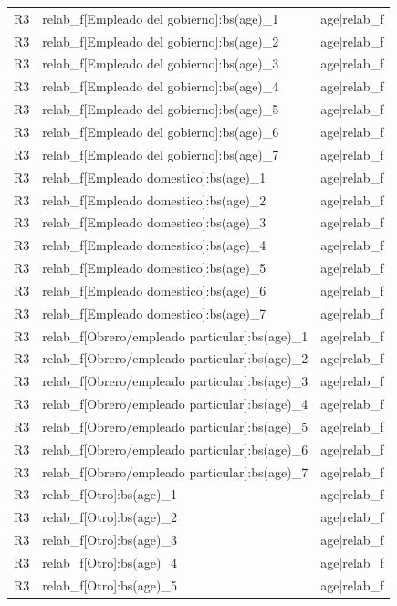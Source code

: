 \begin{longtable}{lll}
R3 & relab\_f[Empleado del gobierno]:bs(age)\_1 & age|relab\_f \\
R3 & relab\_f[Empleado del gobierno]:bs(age)\_2 & age|relab\_f \\
R3 & relab\_f[Empleado del gobierno]:bs(age)\_3 & age|relab\_f \\
R3 & relab\_f[Empleado del gobierno]:bs(age)\_4 & age|relab\_f \\
R3 & relab\_f[Empleado del gobierno]:bs(age)\_5 & age|relab\_f \\
R3 & relab\_f[Empleado del gobierno]:bs(age)\_6 & age|relab\_f \\
R3 & relab\_f[Empleado del gobierno]:bs(age)\_7 & age|relab\_f \\
R3 & relab\_f[Empleado domestico]:bs(age)\_1 & age|relab\_f \\
R3 & relab\_f[Empleado domestico]:bs(age)\_2 & age|relab\_f \\
R3 & relab\_f[Empleado domestico]:bs(age)\_3 & age|relab\_f \\
R3 & relab\_f[Empleado domestico]:bs(age)\_4 & age|relab\_f \\
R3 & relab\_f[Empleado domestico]:bs(age)\_5 & age|relab\_f \\
R3 & relab\_f[Empleado domestico]:bs(age)\_6 & age|relab\_f \\
R3 & relab\_f[Empleado domestico]:bs(age)\_7 & age|relab\_f \\
R3 & relab\_f[Obrero/empleado particular]:bs(age)\_1 & age|relab\_f \\
R3 & relab\_f[Obrero/empleado particular]:bs(age)\_2 & age|relab\_f \\
R3 & relab\_f[Obrero/empleado particular]:bs(age)\_3 & age|relab\_f \\
R3 & relab\_f[Obrero/empleado particular]:bs(age)\_4 & age|relab\_f \\
R3 & relab\_f[Obrero/empleado particular]:bs(age)\_5 & age|relab\_f \\
R3 & relab\_f[Obrero/empleado particular]:bs(age)\_6 & age|relab\_f \\
R3 & relab\_f[Obrero/empleado particular]:bs(age)\_7 & age|relab\_f \\
R3 & relab\_f[Otro]:bs(age)\_1 & age|relab\_f \\
R3 & relab\_f[Otro]:bs(age)\_2 & age|relab\_f \\
R3 & relab\_f[Otro]:bs(age)\_3 & age|relab\_f \\
R3 & relab\_f[Otro]:bs(age)\_4 & age|relab\_f \\
R3 & relab\_f[Otro]:bs(age)\_5 & age|relab\_f \\

\end{longtable}
